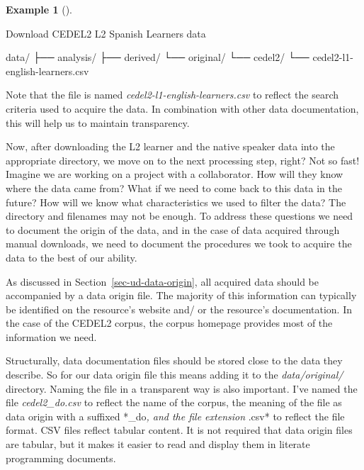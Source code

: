 \documentclass[
  letterpaper,
]{latex/krantz}
\newenvironment{Shaded}{\begin{snugshade}}{\end{snugshade}}
\newcommand{\ExtensionTok}[1]{\textcolor[rgb]{0.00,0.00,0.00}{#1}}
\newcommand{\NormalTok}[1]{\textcolor[rgb]{0.00,0.00,0.00}{#1}}
\theoremstyle{definition}
\newtheorem{example}{Example}[chapter]
\theoremstyle{remark}
\begin{document}
\begin{example}[]\protect\hypertarget{exm-ad-cedel2-learners-download}{}\label{exm-ad-cedel2-learners-download}

Download CEDEL2 L2 Spanish Learners data

\begin{Shaded}
\begin{Highlighting}[]
\ExtensionTok{data/}
\ExtensionTok{├──}\NormalTok{ analysis/}
\ExtensionTok{├──}\NormalTok{ derived/}
\ExtensionTok{└──}\NormalTok{ original/}
    \ExtensionTok{└──}\NormalTok{ cedel2/}
    \ExtensionTok{└──}\NormalTok{ cedel2{-}l1{-}english{-}learners.csv}
\end{Highlighting}
\end{Shaded}

\end{example}

Note that the file is named \emph{cedel2-l1-english-learners.csv} to
reflect the search criteria used to acquire the data. In combination
with other data documentation, this will help us to maintain
transparency.

Now, after downloading the L2 learner and the native speaker data into
the appropriate directory, we move on to the next processing step,
right? Not so fast! Imagine we are working on a project with a
collaborator. How will they know where the data came from? What if we
need to come back to this data in the future? How will we know what
characteristics we used to filter the data? The directory and filenames
may not be enough. To address these questions we need to document the
origin of the data, and in the case of data acquired through manual
downloads, we need to document the procedures we took to acquire the
data to the best of our ability.

As discussed in Section~\ref{sec-ud-data-origin}, all acquired data
should be accompanied by a data origin file. The majority of this
information can typically be identified on the resource's website and/
or the resource's documentation. In the case of the CEDEL2 corpus, the
corpus homepage provides most of the information we need.

Structurally, data documentation files should be stored close to the
data they describe. So for our data origin file this means adding it to
the \emph{data/original/} directory. Naming the file in a transparent
way is also important. I've named the file \emph{cedel2\_do.csv} to
reflect the name of the corpus, the meaning of the file as data origin
with a suffixed *\_do\emph{, and the file extension }.csv* to reflect
the file format. CSV files reflect tabular content. It is not required
that data origin files are tabular, but it makes it easier to read and
display them in literate programming documents.
\end{document}
